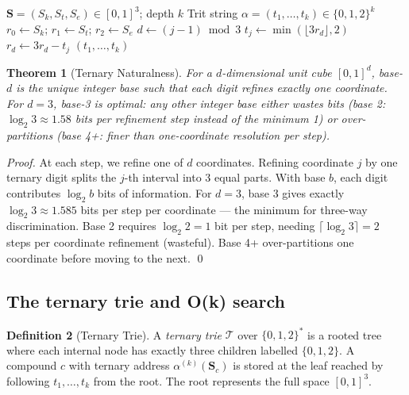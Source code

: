 \documentclass[twocolumn,10pt,a4paper]{article}
\theoremstyle{thmstyle}
\newtheorem{theorem}{Theorem}[section]
\theoremstyle{definition}
\newtheorem{definition}[theorem]{Definition}
\theoremstyle{remark}
\newcommand{\Sv}{\mathbf{S}}
\newcommand{\Sk}{S_{k}}
\newcommand{\St}{S_{t}}
\newcommand{\Se}{S_{e}}
\begin{document}
\begin{algorithm}[h]
\caption{Interleaved Ternary Encoder}
\label{alg:encode}
\begin{algorithmic}[1]
\Require $\Sv = (\Sk,\St,\Se) \in [0,1]^3$; depth $k$
\Ensure Trit string $\alpha = (t_1,\ldots,t_k) \in \{0,1,2\}^k$
\State $r_0 \gets \Sk$;\; $r_1 \gets \St$;\; $r_2 \gets \Se$
  \State $d \gets (j-1) \bmod 3$
  \State $t_j \gets \min(\lfloor 3 r_d \rfloor, 2)$
  \State $r_d \gets 3 r_d - t_j$
\EndFor
\Return $(t_1, \ldots, t_k)$
\end{algorithmic}
\end{algorithm}

\begin{theorem}[Ternary Naturalness]
\label{thm:ternary-natural}
For a $d$-dimensional unit cube $[0,1]^d$, base-$d$ is the unique
integer base such that each digit refines exactly one coordinate. For
$d = 3$, base-3 is optimal: any other integer base either wastes bits
(base 2: $\log_2 3 \approx 1.58$ bits per refinement step instead of
the minimum 1) or over-partitions (base 4+: finer than one-coordinate
resolution per step).
\end{theorem}

\begin{proof}
At each step, we refine one of $d$ coordinates. Refining coordinate
$j$ by one ternary digit splits the $j$-th interval into 3 equal parts.
With base $b$, each digit contributes $\log_2 b$ bits of information.
For $d=3$, base 3 gives exactly $\log_2 3 \approx 1.585$ bits per step
per coordinate — the minimum for three-way discrimination. Base 2 requires
$\log_2 2 = 1$ bit per step, needing $\lceil\log_2 3\rceil = 2$ steps per
coordinate refinement (wasteful). Base 4+ over-partitions one coordinate
before moving to the next. \qed
\end{proof}

\subsection{The ternary trie and O(k) search}

\begin{definition}[Ternary Trie]
\label{def:trie}
A \emph{ternary trie} $\mathcal{T}$ over $\{0,1,2\}^*$ is a rooted
tree where each internal node has exactly three children labelled
$\{0,1,2\}$. A compound $c$ with ternary address $\alpha^{(k)}(\Sv_c)$
is stored at the leaf reached by following $t_1,\ldots,t_k$ from the
root. The root represents the full space $[0,1]^3$.
\end{definition}
\end{document}
